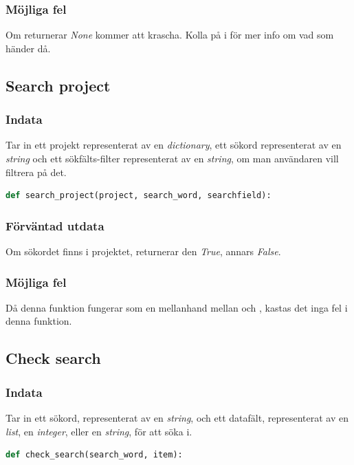 \documentclass{TDP003mall}
\begin{document}
\subsubsection{Möjliga fel}
Om \uline{} returnerar \textit{None} kommer \uline{} att krascha. Kolla på \uline{} i \uline{} för mer info om vad som händer då.

\subsection{Search project}
\label{sec:searchproject}
\subsubsection{Indata}
Tar in ett projekt representerat av en \textit{dictionary}, ett sökord representerat av en \textit{string} och ett sökfälts-filter representerat av en \textit{string}, om man användaren vill filtrera på det. \begin{lstlisting}[caption={Definering av search\_project()}, language={Python}]
def search_project(project, search_word, searchfield):
\end{lstlisting}
\subsubsection{Förväntad utdata}
Om sökordet finns i projektet, returnerar den \textit{True}, annars \textit{False}.
\subsubsection{Möjliga fel}
Då denna funktion fungerar som en mellanhand mellan \uline{} och \uline{}, kastas det inga fel i denna funktion.
\subsection{Check search}
\label{sec:checksearch}
\subsubsection{Indata}
Tar in ett sökord, representerat av en \textit{string}, och ett datafält, representerat av en \textit{list}, en \textit{integer}, eller en \textit{string}, för att söka i. 
\begin{lstlisting}[caption={Definering av \textbf{check\_search()} funktionen.}, language=Python]
def check_search(search_word, item):
\end{lstlisting}
\end{document}

